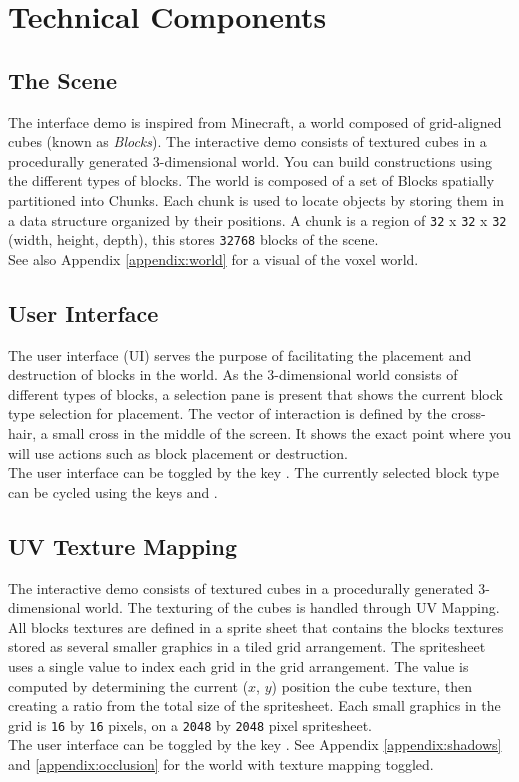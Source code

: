 \documentclass{book}
\begin{document}
\chapter{Technical Components}
\section{The Scene}
The interface demo is inspired from Minecraft, a world composed of grid-aligned cubes (known as \textit{Blocks}).  The interactive demo consists of textured cubes in a procedurally generated 3-dimensional world.  You can build constructions using the different types of blocks.  The world is composed of a set of Blocks spatially partitioned into Chunks.  Each chunk is used to locate objects by storing them in a data structure organized by their positions.   A chunk is a region of \texttt{32} x \texttt{32} x \texttt{32} (width, height, depth), this stores \texttt{32768} blocks of the scene.
\\
See also Appendix \ref{appendix:world} for a visual of the voxel world.
  
\section{User Interface}
The user interface (UI) serves the purpose of facilitating the placement and destruction of blocks in the world.  As the 3-dimensional world consists of different types of blocks, a selection pane is present that shows the current block type selection for placement.  The vector of interaction is defined by the cross-hair, a small cross in the middle of the screen.  It shows the exact point where you will use actions such as block placement or destruction.
\\
The user interface can be toggled by the key .  The currently selected block type can be cycled using the keys  and .

\section{UV Texture Mapping}
The interactive demo consists of textured cubes in a procedurally generated 3-dimensional world.  The texturing of the cubes is handled through UV Mapping.  All blocks textures are defined in a sprite sheet that contains the blocks textures stored as several smaller graphics in a tiled grid arrangement.  The spritesheet uses a single value to index each grid in the grid arrangement.  The value is computed by determining the current ($x$, $y$) position the cube texture, then creating a ratio from the total size of the spritesheet.  Each small graphics in the grid is \texttt{16} by \texttt{16} pixels, on a \texttt{2048} by \texttt{2048} pixel spritesheet.
\\
The user interface can be toggled by the key .  See Appendix \ref{appendix:shadows} and \ref{appendix:occlusion} for the world with texture mapping toggled.
    
\end{document}
